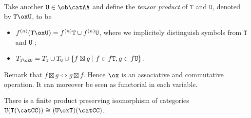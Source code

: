 \documentclass[a4paper, 12pt]{article}
\newcommand{\theory}{\mathtt}
\begin{document}
Take another $\theory{U} \in \ob \catAA$ and define the \emph{tensor product} of $\theory{T}$ and $\theory{U}$, denoted by $\theory{T} \ox \theory{U}$, to be
\begin{itemize}
	\item $f^{(n)} (\theory{T} \ox \theory{U}) = f^{(n)} \theory{T} \cup f^{(n)} \theory{U}$, where we implicitely distinguish symbols from $\theory{T}$ and $\theory{U}$ ;
	\item $T_{\theory{T} \ox \theory{U}} = T_\theory{T} \cup T_\theory{U} \cup \{ f \boxtimes g \mid f \in f \theory{T}, g \in f \theory{U} \}$.
\end{itemize}
Remark that $f \boxtimes g \iff g \boxtimes f$. Hence $\ox$ is an associative and commutative operation. It can moreover be seen as functorial in each variable.

\begin{theorem}
	There is a finite product preserving isomorphism of categories $\theory{U} (\theory{T} (\catCC)) \cong (\theory{U} \ox \theory{T}) (\catCC)$.
\end{theorem}
\end{document}
